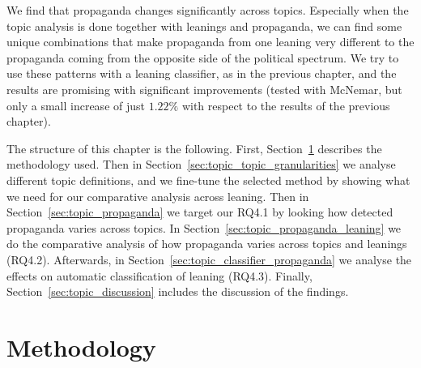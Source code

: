 We find that propaganda changes significantly across topics. Especially when the topic analysis is done together with leanings and propaganda, we can find some unique combinations that make propaganda from one leaning very different to the propaganda coming from the opposite side of the political spectrum.
We try to use these patterns with a leaning classifier, as in the previous chapter, and the results are promising with significant improvements (tested with McNemar, but only a small increase of just $1.22\%$ with respect to the results of the previous chapter).

The structure of this chapter is the following. First, Section~\ref{sec:topic_method} describes the methodology used. Then in Section~\ref{sec:topic_topic_granularities} we analyse different topic definitions, and we fine-tune the selected method by showing what we need for our comparative analysis across leaning.
Then in Section~\ref{sec:topic_propaganda} we target our RQ4.1 by looking how detected propaganda varies across topics.
In Section~\ref{sec:topic_propaganda_leaning} we do the comparative analysis of how propaganda varies across topics and leanings (RQ4.2).
Afterwards, in Section~\ref{sec:topic_classifier_propaganda} we analyse the effects on automatic classification of leaning (RQ4.3).
Finally, Section~\ref{sec:topic_discussion} includes the discussion of the findings.







\section{\statusgreen Methodology}
\label{sec:topic_method}

